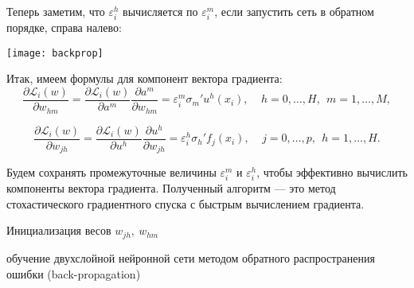 \documentclass{article}
\begin{document}
	Теперь заметим, что $\varepsilon_i^h$ вычисляется по $\varepsilon_i^m$, если запустить сеть в обратном порядке, справа налево:
	
	\begin{center}
		\begin{minipage}{0.51\linewidth}
			\centering
			\texttt{[image: backprop]}
		\end{minipage}
	\end{center}
	
	Итак, имеем формулы для компонент вектора градиента:
	\begin{equation*}
		\frac{\partial \mathcal{L}_i(w)}{\partial w_{hm}} = \frac{\partial \mathcal{L}_i(w)}{\partial a^m} \frac{\partial a^m}{\partial w_{hm}} =   \varepsilon^m_i \sigma_m' u^h(x_i), ~~~~~ h=0,\ldots,H, ~~ m=1,\ldots,M,
	\end{equation*}
	
	\begin{equation*}
		\frac{\partial \mathcal{L}_i(w)}{\partial w_{jh}} = \frac{\partial \mathcal{L}_i(w)}{\partial u^h} \frac{\partial u^h}{\partial w_{jh}} =   \varepsilon^h_i \sigma_h' f_j(x_i), ~~~~~ j=0,\ldots,p, ~~ h=1,\ldots,H.
	\end{equation*}
	
	Будем сохранять промежуточные величины $\varepsilon_i^m$ и $\varepsilon_i^h$, чтобы эффективно вычислить компоненты вектора градиента. Полученный алгоритм --- это метод стохастического градиентного спуска с быстрым вычислением градиента. \\
	
	\begin{algorithm}[H]
		\SetAlgoLined
		
		Инициализация весов $w_{jh},~ w_{hm}$\;
		\caption{обучение двухслойной нейронной сети методом обратного распространения ошибки (back-propagation)}
	\end{algorithm}
	~~~\\
	~~~\\
	~~~ \\
	
\end{document}
